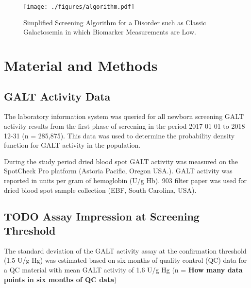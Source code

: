 \documentclass[review]{elsarticle}
\begin{document}
\begin{figure}[htbp]
\centering
\texttt{[image: ./figures/algorithm.pdf]}
\caption{\label{fig:org99dddbf}Simplified Screening Algorithm for a Disorder such as Classic Galactosemia in which Biomarker Measurements are Low.}
\end{figure}

\clearpage

\section*{Material and Methods}
\label{sec:orge3096fc}
\subsection*{GALT Activity Data}
\label{sec:orgd0a7c3b}
The laboratory information system was queried for all newborn
screening GALT activity results from the first phase of screening in
the period 2017-01-01 to 2018-12-31 (n = 285,875). This data was used
to determine the probability density function for GALT activity in the
population.

During the study period dried blood spot GALT activity was measured
on the SpotCheck Pro platform (Astoria Pacific, Oregon USA.). GALT
activity was reported in units per gram of hemoglobin (U/g Hb). 903
filter paper was used for dried blood spot sample collection (EBF,
South Carolina, USA).

\subsection*{{\bfseries\sffamily TODO} Assay Impression at Screening Threshold}
\label{sec:org096a609}
The standard deviation of the GALT activity assay at the confirmation
threshold (1.5 U/g Hg) was estimated based on six months of quality
control (QC) data for a QC material with mean GALT activity of 1.6 U/g
Hg (n = \textbf{How many data points in six months of QC data})
\end{document}
